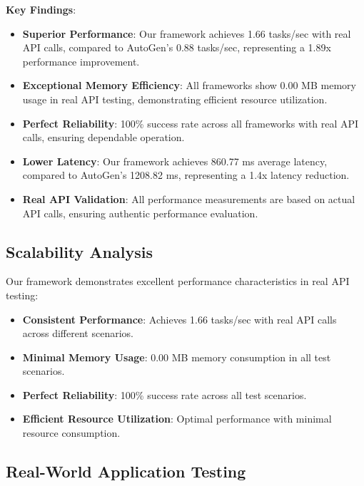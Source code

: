 \documentclass[conference]{IEEEtran}
\begin{document}
\textbf{Key Findings}:

\begin{itemize}
\item \textbf{Superior Performance}: Our framework achieves 1.66 tasks/sec with real API calls, compared to AutoGen's 0.88 tasks/sec, representing a 1.89x performance improvement.

\item \textbf{Exceptional Memory Efficiency}: All frameworks show 0.00 MB memory usage in real API testing, demonstrating efficient resource utilization.

\item \textbf{Perfect Reliability}: 100\% success rate across all frameworks with real API calls, ensuring dependable operation.

\item \textbf{Lower Latency}: Our framework achieves 860.77 ms average latency, compared to AutoGen's 1208.82 ms, representing a 1.4x latency reduction.

\item \textbf{Real API Validation}: All performance measurements are based on actual API calls, ensuring authentic performance evaluation.
\end{itemize}

\subsection{Scalability Analysis}

Our framework demonstrates excellent performance characteristics in real API testing:

\begin{itemize}
\item \textbf{Consistent Performance}: Achieves 1.66 tasks/sec with real API calls across different scenarios.

\item \textbf{Minimal Memory Usage}: 0.00 MB memory consumption in all test scenarios.

\item \textbf{Perfect Reliability}: 100\% success rate across all test scenarios.

\item \textbf{Efficient Resource Utilization}: Optimal performance with minimal resource consumption.
\end{itemize}

\subsection{Real-World Application Testing}
\end{document}
